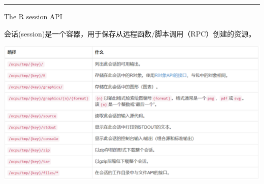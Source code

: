\documentclass[]{book}
\begin{document}
\begin{center}\rule{0.5\linewidth}{\linethickness}\end{center}

The R session API

会话(session)是一个容器，用于保存从远程函数/脚本调用（RPC）创建的资源。

\includegraphics{pic/opencpu/p6.png}
\end{document}
